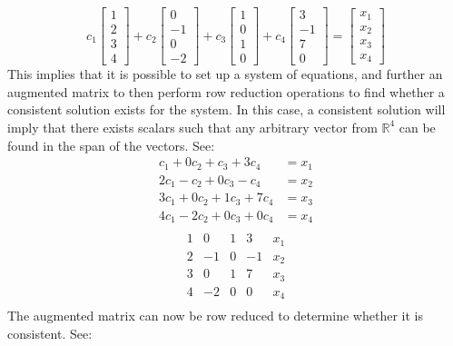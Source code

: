 \documentclass{report}
\begin{document}
$$
c_1 \begin{bmatrix} 1 \\ 2 \\ 3 \\ 4 \end{bmatrix} + c_2 \begin{bmatrix} 0 \\ -1 \\ 0 \\ -2 \end{bmatrix}
+ c_3 \begin{bmatrix} 1 \\ 0 \\ 1 \\ 0 \end{bmatrix} + c_4 \begin{bmatrix} 3 \\ -1 \\ 7 \\ 0 \end{bmatrix}
= \begin{bmatrix} x_1 \\ x_2 \\ x_3 \\ x_4 \end{bmatrix}
$$
This implies that it is possible to set up a system of equations,  and further an augmented matrix to then perform row reduction operations to find whether a consistent solution exists for the system.  In this case,  a consistent solution will imply that there exists scalars such that any arbitrary vector from $\mathbb{R}^4$ can be found in the span of the vectors.  See:
$$
\begin{aligned}
c_1 + 0c_2 + c_3 + 3c_4 & = x_1 \\
2c_1 - c_2 + 0c_3 - c_4 &  = x_2 \\
3c_1 + 0c_2 + 1c_3 + 7c_4 & = x_3 \\
4c_1 - 2c_2 + 0c_3 + 0c_4 & = x_4 \\
\end{aligned}
$$
$$
\begin{array}{cccc|c}
    1 & 0 & 1 & 3 & x_1 \\
    2 & -1 & 0 & -1 & x_2 \\
    3 & 0 & 1 & 7 & x_3 \\
    4 & -2 & 0 & 0 & x_4 \\
\end{array}
$$
The augmented matrix can now be row reduced to determine whether it is consistent.  See:
\end{document}
